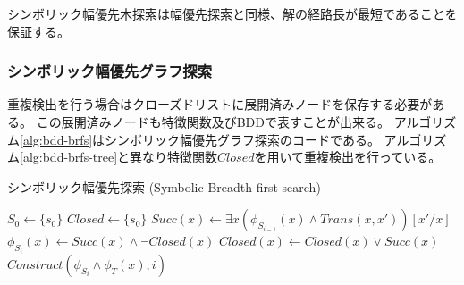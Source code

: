 シンボリック幅優先木探索は幅優先探索と同様、解の経路長が最短であることを保証する。


\subsubsection{シンボリック幅優先グラフ探索}

重複検出を行う場合はクローズドリストに展開済みノードを保存する必要がある。
この展開済みノードも特徴関数及びBDDで表すことが出来る。
アルゴリズム\ref{alg:bdd-brfs}はシンボリック幅優先グラフ探索のコードである。
アルゴリズム\ref{alg:bdd-brfs-tree}と異なり特徴関数$Closed$を用いて重複検出を行っている。

\begin{algorithm}
\caption{シンボリック幅優先探索 (Symbolic Breadth-first search)}
\label{alg:bdd-brfs}
	$S_0 \leftarrow \{s_0\}$\;
	$Closed \leftarrow \{s_0\}$\;
	 {
		$Succ(x) \leftarrow \exists x (\phi_{S_{i-1}}(x) \land Trans(x,x'))[x'/x]$\;
		$\phi_{S_i}(x) \leftarrow Succ(x) \land \lnot Closed(x)$\;
		$Closed(x) \leftarrow Closed(x) \lor Succ(x)$\;
		 {
			\Return $Construct(\phi_{S_i} \land \phi_T(x), i)$\;
		}
	}
\end{algorithm}







